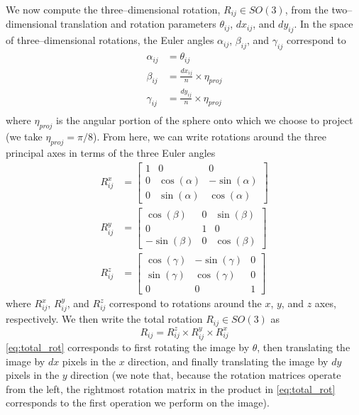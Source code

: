 \documentclass[11pt]{article}
\begin{document}
We now compute the three--dimensional rotation, $R_{ij} \in SO(3)$, from the two--dimensional translation and rotation parameters $\theta_{ij}$, $dx_{ij}$, and $dy_{ij}$.
%
In the space of three--dimensional rotations, the Euler angles $\alpha_{ij}$, $\beta_{ij}$, and $\gamma_{ij}$ correspond to
\begin{equation} \label{eq:angle_relations}
\begin{aligned}
	\alpha_{ij} &= \theta_{ij} \\
	\beta_{ij} &= \frac{dx_{ij}}{n} \times \eta_{proj} \\
	\gamma_{ij} &= \frac{dy_{ij}}{n} \times \eta_{proj} \\
\end{aligned}
\end{equation}
where $\eta_{proj}$ is the angular portion of the sphere onto which we choose to project (we take $\eta_{proj} =  \pi/8$).
%
From here, we can write rotations around the three principal axes in terms of the three Euler angles
\begin{equation}
\begin{aligned}
	R^x_{ij} &= \begin{bmatrix}
	1 & 0 & 0 \\
    0 & \cos(\alpha) & -\sin(\alpha) \\
    0 & \sin(\alpha) & \cos(\alpha)
	\end{bmatrix} \\
	R^y_{ij} &= \begin{bmatrix}
	\cos(\beta) & 0 & \sin(\beta) \\
    0 & 1 & 0 \\
    -\sin(\beta) & 0 & \cos(\beta)
    \end{bmatrix} \\
	R^z_{ij} &= \begin{bmatrix} 
	\cos(\gamma) & -\sin(\gamma) & 0 \\
    \sin(\gamma) & \cos(\gamma) & 0 \\
    0 & 0 & 1 
    \end{bmatrix}
\end{aligned}
\end{equation}
where $R^x_{ij}$, $R^y_{ij}$, and $R^z_{ij}$ correspond to rotations around the $x$, $y$, and $z$ axes, respectively.
%
We then write the total rotation $R_{ij} \in SO(3)$ as 
\begin{equation} \label{eq:total_rot}
	R_{ij}	 = R^z_{ij} \times R^y_{ij} \times R^x_{ij}
\end{equation}
%
\eqref{eq:total_rot} corresponds to first rotating the image by $\theta$, then translating the image by $dx$ pixels in the $x$ direction, and finally translating the image by $dy$ pixels in the $y$ direction (we note that, because the rotation matrices operate from the left, the rightmost rotation matrix in the product in \eqref{eq:total_rot} corresponds to the first operation we perform on the image).
\end{document}
